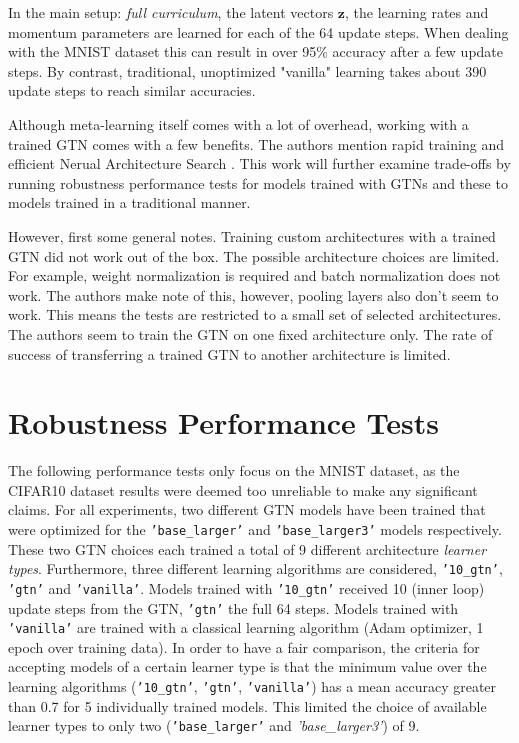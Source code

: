 \documentclass[10pt]{article}
\renewcommand\vec[1]{\boldsymbol{\mathbf {#1}}}
\begin{document}
In the main setup: \textit{full curriculum}, the latent vectors $\vec z$,
the learning rates and momentum parameters are learned for each of
the 64 update steps.
When dealing with the MNIST dataset this can result in over 95\%
accuracy after a few update steps.
By contrast, traditional, unoptimized "vanilla" learning
takes about 390 update steps to reach similar accuracies.

Although meta-learning itself comes with a lot of overhead, 
working with a trained GTN comes with a few benefits.
The authors mention rapid training and efficient Nerual Architecture Search \cite{such2019generative}.
This work will further examine trade-offs by running 
robustness performance tests for models trained with GTNs
and these to models trained in a traditional manner.

However, first some general notes.
Training custom architectures with a trained GTN did not work out of the box. 
The possible architecture choices are limited. For example, weight normalization is required and batch normalization does not work. The authors make note of this, however, pooling layers also don't seem to work.
This means the tests are restricted to a small set of selected architectures.
The authors seem to train the GTN on one fixed architecture only. The rate of success of transferring a trained GTN to another architecture is limited.


\section{Robustness Performance Tests}

The following performance tests only focus on the MNIST dataset, as the 
CIFAR10 dataset results were deemed too unreliable to make any significant claims.
For all experiments, two different GTN models have been trained that were optimized for the \texttt{'base\_larger'} and \texttt{'base\_larger3'} models respectively.
These two GTN choices each trained a total of 9 different architecture \textit{learner types}.
Furthermore, three different learning algorithms are considered, \texttt{'10\_gtn'}, \texttt{'gtn'} and \texttt{'vanilla'}.
Models trained with \texttt{'10\_gtn'} received 10 (inner loop) update steps from the GTN, \texttt{'gtn'} the full 64 steps.
Models trained with \texttt{'vanilla'} are trained with a classical learning algorithm (Adam optimizer, 1 epoch over training data).
In order to have a fair comparison, the criteria for accepting models of a certain learner type is that the minimum value over the learning algorithms (\texttt{'10\_gtn'}, \texttt{'gtn'}, \texttt{'vanilla'}) has a mean accuracy greater than 0.7 for 5 individually trained models.
This limited the choice of available learner types to only two (\texttt{'base\_larger'} and \textit{'base\_larger3'}) of 9.
\end{document}
